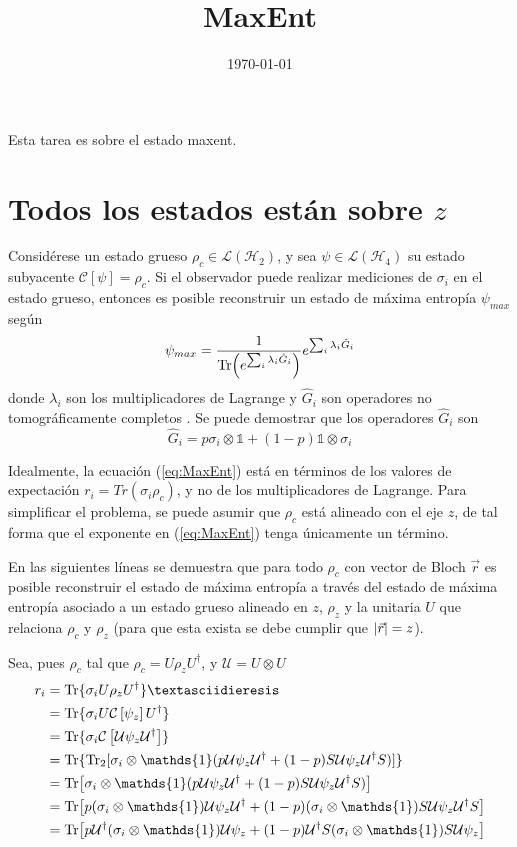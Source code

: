 \documentclass[onecolumn,11pt]{article}
\title{MaxEnt}
\date{\today}
\newcommand{\mcU}{\mathcal{U}}
\newcommand{\mcL}{\mathcal{L}}
\newcommand{\mcH}{\mathcal{H}}
\newcommand{\mcC}{\mathcal{C}}
\newcommand{\Id}{\mathds{1}}%
\newcommand{\CG}[1]{\mcC\left[#1\right]}
\begin{document}
\maketitle
\thispagestyle{empty}
Esta tarea es sobre el estado maxent.
\section{Todos los estados están sobre $z$}
Considérese un estado grueso $\rho_{c}\in \mcL(\mcH_{2})$, y sea $\psi\in\mcL(\mcH_{4})$ su estado subyacente $\CG{\psi}=\rho_{c}$. Si el observador puede realizar mediciones de $\sigma_{i}$ en el estado grueso, entonces es posible reconstruir un estado de máxima entropía $\psi_{max}$ según
\begin{equation}\label{eq:MaxEnt}
\psi_{max}=\frac{1}{\Tr(e^{\sum_{i}\lambda_{i}\hat{G}_{i}})}e^{\sum_{i}\lambda_{i}\hat{G}_{i}}
\end{equation}
donde $\lambda_{i}$ son los multiplicadores de Lagrange y $\hat{G}_{i}$ son operadores no tomográficamente completos \cite{MaxEnt}. Se puede demostrar que los operadores $\hat{G}_{i}$ son
\begin{equation}
\hat{G}_{i}=p\sigma_{i}\otimes\Id+(1-p)\Id\otimes\sigma_{i}
\end{equation}

Idealmente, la ecuación (\ref{eq:MaxEnt}) está en términos de los valores de expectación $r_{i}=Tr(\sigma_{i}\rho_{c})$, y no de los multiplicadores de Lagrange. Para simplificar el problema, se puede asumir que $\rho_{c}$ está alineado con el eje $z$, de tal forma que el exponente en (\ref{eq:MaxEnt}) tenga únicamente un término.


En las siguientes líneas se demuestra que para todo $\rho_{c}$ con vector de Bloch $\vec{r}$ es posible reconstruir el estado de máxima entropía a través del estado de máxima entropía asociado a un estado grueso alineado en $z$, $\rho_{z}$ y la unitaria $U$ que relaciona $\rho_{c}$ y $\rho_{z}$ (para que esta exista se debe cumplir que $\abs{\vec{r}}=z$).


Sea, pues $\rho_{c}$ tal que $\rho_{c}=U\rho_{z}U^{\dag}$, y $\mcU=U\otimes U$
\begin{align*}
r_{i}&=\Tr\{\sigma_{i}U\rho_{z}U^{\dag}\}¨\\
&=\Tr\{\sigma_{i}U\CG{\psi_{z}}U^{\dag}\}\\
&=\Tr\{\sigma_{i}\CG{\mcU\psi_{z}\mcU^{\dag}}\}\\
&=\Tr\{\Tr_{2}[\sigma_{i}\otimes\Id(p\mcU\psi_{z}\mcU^{\dag}+(1-p)S\mcU\psi_{z}\mcU^{\dag}S)]\}\\
&=\Tr[\sigma_{i}\otimes\Id(p\mcU\psi_{z}\mcU^{\dag}+(1-p)S\mcU\psi_{z}\mcU^{\dag}S)]\\
&=\Tr[p(\sigma_{i}\otimes\Id)\mcU\psi_{z}\mcU^{\dag}+(1-p)(\sigma_{i}\otimes\Id)S\mcU\psi_{z}\mcU^{\dag}S]\\
&=\Tr[p\mcU^{\dag}(\sigma_{i}\otimes\Id)\mcU\psi_{z}+(1-p)\mcU^{\dag}S(\sigma_{i}\otimes\Id) S\mcU\psi_{z}]\\
\end{align*}




\end{document}
